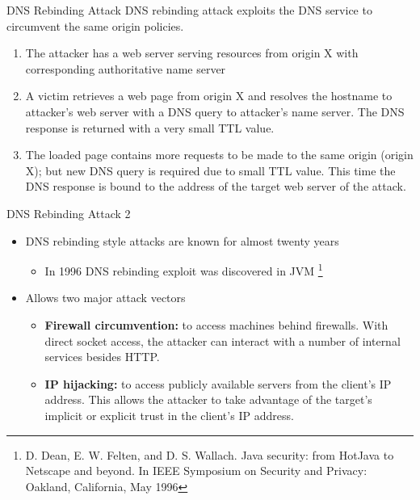 \documentclass{beamer}
\begin{document}
\begin{frame}{DNS Rebinding Attack}
    DNS rebinding attack exploits the DNS service to circumvent the same origin policies. 
    \begin{enumerate}
        \item The attacker has a web server serving resources from origin X with
        corresponding authoritative name server
        \item A victim retrieves a web page from origin X and
        resolves the hostname to attacker's web server with a DNS query to
        attacker's name server. The DNS response is returned with a very small
        TTL value.
        \item The loaded page contains more requests to be made to the same origin
        (origin X); but new DNS query is required due to small TTL value. This
        time the DNS response is bound to the address of the target web server of
        the attack.
    \end{enumerate}
\end{frame}

\begin{frame}{DNS Rebinding Attack 2}
    \begin{itemize}
        \item DNS rebinding style attacks are known for almost twenty years
        \begin{itemize}
            \item In 1996 DNS rebinding exploit was discovered in JVM
            \footnote{D. Dean, E. W. Felten, and D. S. Wallach. Java
            security: from HotJava to Netscape and beyond. In
            IEEE Symposium on Security and Privacy: Oakland,
            California, May 1996}
        \end{itemize}
        \item Allows two major attack vectors
        \begin{itemize}
            \item \textbf{Firewall circumvention:} 
             to access machines behind firewalls. With direct socket access, the
             attacker can interact with a number of internal services besides
             HTTP.
            \item \textbf{IP hijacking:}
            to access publicly available servers from the client’s IP address.
            This allows the attacker to take advantage of the target’s implicit
            or explicit trust in the client’s IP address.
        \end{itemize}
    \end{itemize}
\end{frame}
\end{document}

